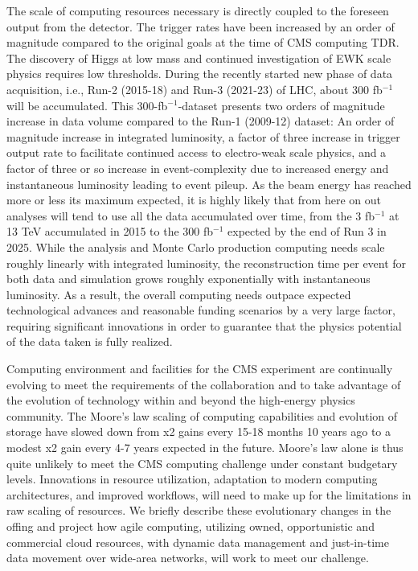 \documentclass[11pt,a4paper]{article}
\begin{document}
The scale of computing resources necessary is directly coupled to the
foreseen output from the detector.  The trigger rates have been
increased by an order of magnitude compared to the original goals at
the time of CMS computing TDR. The discovery of Higgs at low mass and
continued investigation of EWK scale physics requires low thresholds.
During the recently started new
phase of data acquisition, i.e., Run-2 (2015-18) and Run-3 (2021-23)
of LHC, about 300 fb$^{-1}$ will be accumulated. This
300-fb$^{-1}$-dataset presents two orders of magnitude increase in
data volume compared to the Run-1 (2009-12) dataset: An order of magnitude
increase in integrated luminosity, a factor of three increase in
trigger output rate to facilitate continued access to electro-weak
scale physics, and a factor of three or so increase in
event-complexity due to increased energy and instantaneous luminosity
leading to event pileup.
As the beam energy has reached more or less its maximum expected, it
is highly likely that from here on out analyses will tend to use all
the data accumulated over time, from the 3 fb$^{-1}$ at 13 TeV accumulated in 2015 to
the 300 fb$^{-1}$ expected by the end of Run 3 in 2025.
While the analysis and Monte Carlo production computing needs scale
roughly linearly with integrated luminosity, the reconstruction time
per event for both data and simulation grows roughly exponentially
with instantaneous luminosity.  As a result, the overall computing
needs outpace expected technological advances and reasonable 
funding scenarios by a very large factor,
requiring significant innovations in order to guarantee that the
physics potential of the data taken is fully realized.

Computing environment and facilities for the CMS experiment are
continually evolving to meet the requirements of the collaboration and
to take advantage of the evolution of technology within and beyond
the high-energy physics community. 
The Moore's law scaling of computing capabilities and evolution of
storage have slowed down from x2 gains every 15-18 months 10 years ago to a modest x2 gain every 4-7 years expected in the future.
Moore's law alone is thus quite unlikely to meet the CMS computing challenge under constant
budgetary levels. Innovations in resource utilization,
adaptation to modern computing architectures, and improved workflows,
will need to make up for the limitations in raw scaling of resources. We
briefly describe these evolutionary changes in the offing and project
how agile computing, utilizing owned, opportunistic and commercial
cloud resources, with dynamic data management and just-in-time data
movement over wide-area networks, will work to meet our challenge. 
\end{document}
